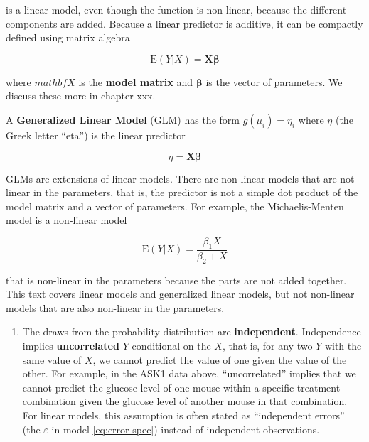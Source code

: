 \documentclass[]{book}
\providecommand{\tightlist}{%
  \setlength{\itemsep}{0pt}\setlength{\parskip}{0pt}}
\begin{document}
is a linear model, even though the function is non-linear, because the different components are added. Because a linear predictor is additive, it can be compactly defined using matrix algebra

\begin{equation}
\mathrm{E}(Y|X) = \mathbf{X}\boldsymbol{\beta}
\end{equation}

where \(mathbf{X}\) is the \textbf{model matrix} and \(\boldsymbol{\beta}\) is the vector of parameters. We discuss these more in chapter xxx.

A \textbf{Generalized Linear Model} (GLM) has the form \(g(\mu_i) = \eta_i\) where \(\eta\) (the Greek letter ``eta'') is the linear predictor

\begin{equation}
\eta = \mathbf{X}\boldsymbol{\beta} 
\end{equation}

GLMs are extensions of linear models. There are non-linear models that are not linear in the parameters, that is, the predictor is not a simple dot product of the model matrix and a vector of parameters. For example, the Michaelis-Menten model is a non-linear model

\begin{equation}
\mathrm{E}(Y|X)  = \frac{\beta_1 X}{\beta_2 + X}
\end{equation}

that is non-linear in the parameters because the parts are not added together. This text covers linear models and generalized linear models, but not non-linear models that are also non-linear in the parameters.

\begin{enumerate}
\def\labelenumi{\arabic{enumi}.}
\setcounter{enumi}{1}
\tightlist
\item
  The draws from the probability distribution are \textbf{independent}. Independence implies \textbf{uncorrelated} \(Y\) conditional on the \(X\), that is, for any two \(Y\) with the same value of \(X\), we cannot predict the value of one given the value of the other. For example, in the ASK1 data above, ``uncorrelated'' implies that we cannot predict the glucose level of one mouse within a specific treatment combination given the glucose level of another mouse in that combination. For linear models, this assumption is often stated as ``independent errors'' (the \(\varepsilon\) in model \eqref{eq:error-spec}) instead of independent observations.
\end{enumerate}
\end{document}
